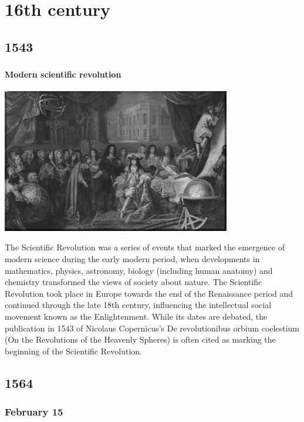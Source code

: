 \documentclass[11pt]{report}
\begin{document}
								
\part{16th century}
\chapter{1543}
\section{}
\subsection{Modern scientific revolution}
\vspace{2mm}\begin{center}\includegraphics[width=10cm]{./img/screvolution.jpg}\end{center}
The Scientific Revolution was a series of events that marked the emergence of modern science during the early modern period, when developments in mathematics, physics, astronomy, biology (including human anatomy) and chemistry transformed the views of society about nature. The Scientific Revolution took place in Europe towards the end of the Renaissance period and continued through the late 18th century, influencing the intellectual social movement known as the Enlightenment. While its dates are debated, the publication in 1543 of Nicolaus Copernicus's De revolutionibus orbium coelestium (On the Revolutions of the Heavenly Spheres) is often cited as marking the beginning of the Scientific Revolution.

\chapter{1564}
\section{February 15}
\end{document}
